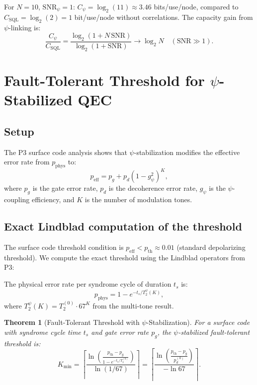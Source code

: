 \documentclass[11pt]{article}
\newtheorem{theorem}{Theorem}[section]
\theoremstyle{definition}
\theoremstyle{remark}
\begin{document}
For $N = 10$, $\mathrm{SNR}_\psi = 1$: $C_\psi = \log_2(11) \approx
3.46$ bits/use/node, compared to $C_{\mathrm{SQL}} = \log_2(2) = 1$
bit/use/node without correlations. The capacity gain from $\psi$-linking
is:
\begin{equation}
\frac{C_\psi}{C_{\mathrm{SQL}}} = \frac{\log_2(1 + N\,\mathrm{SNR})}
{\log_2(1 + \mathrm{SNR})} \to \log_2 N \quad
(\mathrm{SNR} \gg 1).
\end{equation}

\section{Fault-Tolerant Threshold for $\psi$-Stabilized QEC}
\label{sec:fault-tolerant}

\subsection{Setup}

The P3 surface code analysis shows that $\psi$-stabilization modifies
the effective error rate from $p_{\mathrm{phys}}$ to:
\begin{equation}
p_{\mathrm{eff}} = p_g + p_d(1 - g_\psi^2)^K,
\end{equation}
where $p_g$ is the gate error rate, $p_d$ is the decoherence error
rate, $g_\psi$ is the $\psi$-coupling efficiency, and $K$ is the
number of modulation tones.

\subsection{Exact Lindblad computation of the threshold}

The surface code threshold condition is $p_{\mathrm{eff}} < p_{\mathrm{th}}
\approx 0.01$ (standard depolarizing threshold). We compute the exact
threshold using the Lindblad operators from P3:

The physical error rate per syndrome cycle of duration $t_s$ is:
\begin{equation}
p_{\mathrm{phys}} = 1 - e^{-t_s / T_2^{\psi}(K)},
\end{equation}
where $T_2^\psi(K) = T_2^{(0)} \cdot 67^K$ from the multi-tone result.

\begin{theorem}[Fault-Tolerant Threshold with $\psi$-Stabilization]
For a surface code with syndrome cycle time $t_s$ and gate error rate
$p_g$, the $\psi$-stabilized fault-tolerant threshold is:
\begin{equation}
\boxed{K_{\min} = \left\lceil \frac{\ln\!\left(
\frac{p_{\mathrm{th}} - p_g}{1 - e^{-t_s/T_2^{(0)}}}\right)}
{\ln(1/67)} \right\rceil = \left\lceil \frac{\ln\!\left(
\frac{p_{\mathrm{th}} - p_g}{p_d^{(0)}}\right)}
{-\ln 67} \right\rceil}.
\end{equation}
\end{theorem}
\end{document}
